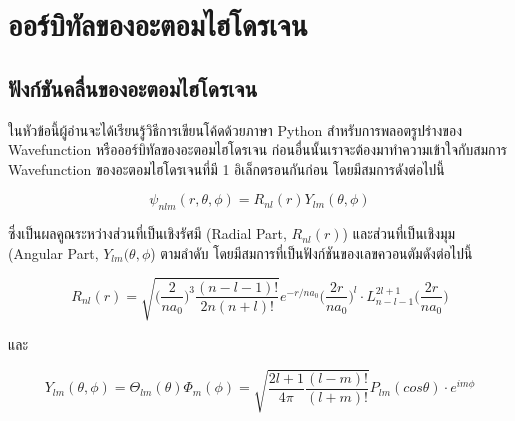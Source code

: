 

\chapter{ออร์บิทัลของอะตอมไฮโดรเจน}
\label{ch:hydro_orbitals}

\section{ฟังก์ชันคลื่นของอะตอมไฮโดรเจน}
\label{sec:hydro_wfn}

ในหัวข้อนี้ผู้อ่านจะได้เรียนรู้วิธีการเขียนโค้ดด้วยภาษา Python สำหรับการพลอตรูปร่างของ Wavefunction หรือออร์บิทัลของอะตอมไฮโดรเจน 
ก่อนอื่นนั้นเราจะต้องมาทำความเข้าใจกับสมการ Wavefunction ของอะตอมไฮโดรเจนที่มี 1 อิเล็กตรอนกันก่อน โดยมีสมการดังต่อไปนี้

\begin{equation}\label{eq:hydro_wfn}
    \psi_{nlm}(r,\theta,\phi) = R_{nl}(r) Y_{lm}(\theta,\phi)
\end{equation}

\noindent ซึ่งเป็นผลคูณระหว่างส่วนที่เป็นเชิงรัศมี (Radial Part, $R_{nl}(r)$) และส่วนที่เป็นเชิงมุม (Angular Part, $Y_{lm}(\theta, 
\phi$) ตามลำดับ โดยมีสมการที่เป็นฟังก์ชันของเลขควอนตัมดังต่อไปนี้

\begin{equation}\label{eq:hydro_wfn_rad}
R_{nl}(r) = \sqrt{\Big(\frac{2}{n a_0}\Big)^3 \frac{(n-l-1)!}{2n (n+l)!}} e^{-r/n a_0} 
    \Big( \frac{2r}{na_0}\Big)^l  \cdot L^{2l+1}_{n-l-1} \Big(\frac{2r}{n a_0} \Big)
\end{equation}

\noindent และ

\begin{equation}\label{eq:hydro_wfn_ang}
Y_{lm}(\theta,\phi) = \Theta_{lm}(\theta) \Phi_m (\phi) = \sqrt{\frac{2l+1}{4\pi} \frac{(l-m)!}{(l+m)!} } 
    P_{lm}(cos \theta) \cdot e^{im\phi}
\end{equation}

